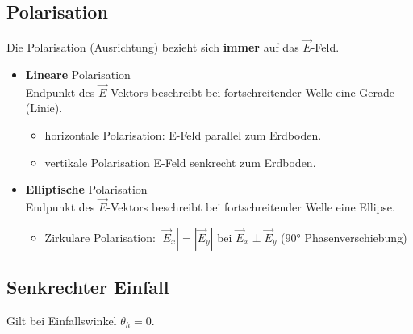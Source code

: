\subsection{Polarisation}
Die Polarisation (Ausrichtung) bezieht sich \textbf{immer} auf das $\vec{E}$-Feld.
\begin{itemize}
	\item \textbf{Lineare} Polarisation\\
	Endpunkt des $\vec{E}$-Vektors beschreibt bei fortschreitender Welle eine Gerade (Linie).
		\begin{itemize}
				\item horizontale Polarisation: E-Feld parallel zum Erdboden.
				\item vertikale Polarisation E-Feld senkrecht zum Erdboden.
			\end{itemize}
	\item \textbf{Elliptische} Polarisation\\
	Endpunkt des $\vec{E}$-Vektors beschreibt bei fortschreitender Welle eine Ellipse.
		\begin{itemize}
				\item Zirkulare Polarisation: $|\vec{E}_x| = |\vec{E}_y|$ bei $ \vec{E}_x \perp \vec{E}_y $ ($ \ang{90}$ Phasenverschiebung)
			\end{itemize}
\end{itemize}


\newpage
\subsection[Senkrechter Einfall]{Senkrechter Einfall}
Gilt bei Einfallswinkel $ \theta_h = 0 $.


